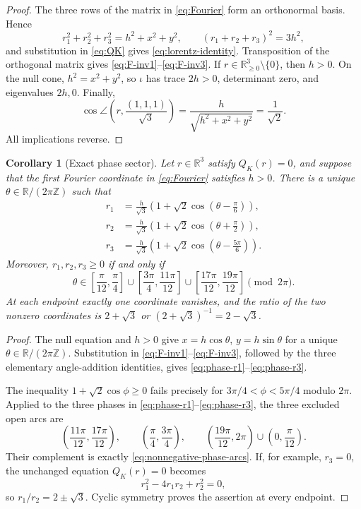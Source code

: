 \documentclass[11pt]{article}
\numberwithin{equation}{section}
\newtheorem{corollary}[theorem]{Corollary}
\theoremstyle{definition}
\theoremstyle{remark}
\newcommand{\R}{\mathbb R}
\newcommand{\Z}{\mathbb Z}
\begin{document}
\begin{proof}
The three rows of the matrix in \eqref{eq:Fourier} form an orthonormal basis.  Hence
\[
 r_1^2+r_2^2+r_3^2=h^2+x^2+y^2,
 \qquad (r_1+r_2+r_3)^2=3h^2,
\]
and substitution in \eqref{eq:QK} gives \eqref{eq:lorentz-identity}.  Transposition of the orthogonal matrix gives \eqref{eq:F-inv1}--\eqref{eq:F-inv3}.  If $r\in\R_{\geq0}^3\setminus\{0\}$, then $h>0$.  On the null cone, $h^2=x^2+y^2$, so $\iota$ has trace $2h>0$, determinant zero, and eigenvalues $2h,0$.  Finally,
\[
 \cos\angle\left(r,\frac{(1,1,1)}{\sqrt3}\right)
 =\frac{h}{\sqrt{h^2+x^2+y^2}}=\frac1{\sqrt2}.
\]
All implications reverse.
\end{proof}

\begin{corollary}[Exact phase sector]
\label{cor:exact-phase-sector}
Let $r\in\R^3$ satisfy $Q_K(r)=0$, and suppose that the first Fourier
coordinate in \eqref{eq:Fourier} satisfies $h>0$.  There is a unique
$\theta\in\R/(2\pi\Z)$ such that
\begin{align}
 r_1&=\frac h{\sqrt3}
 \left(1+\sqrt2\cos\left(\theta-\frac\pi6\right)\right),
 \label{eq:phase-r1}\\
 r_2&=\frac h{\sqrt3}
 \left(1+\sqrt2\cos\left(\theta+\frac\pi2\right)\right),
 \label{eq:phase-r2}\\
 r_3&=\frac h{\sqrt3}
 \left(1+\sqrt2\cos\left(\theta-\frac{5\pi}6\right)\right).
 \label{eq:phase-r3}
\end{align}
Moreover, $r_1,r_2,r_3\geq0$ if and only if
\begin{equation}
 \theta\in
 \left[\frac\pi{12},\frac\pi4\right]
 \cup\left[\frac{3\pi}4,\frac{11\pi}{12}\right]
 \cup\left[\frac{17\pi}{12},\frac{19\pi}{12}\right]
 \pmod {2\pi}.
 \label{eq:nonnegative-phase-arcs}
\end{equation}
At each endpoint exactly one coordinate vanishes, and the ratio of the two
nonzero coordinates is $2+\sqrt3$ or $(2+\sqrt3)^{-1}=2-\sqrt3$.
\end{corollary}

\begin{proof}
The null equation and $h>0$ give
$x=h\cos\theta$, $y=h\sin\theta$ for a unique
$\theta\in\R/(2\pi\Z)$.  Substitution in
\eqref{eq:F-inv1}--\eqref{eq:F-inv3}, followed by the three elementary
angle-addition identities, gives
\eqref{eq:phase-r1}--\eqref{eq:phase-r3}.

The inequality $1+\sqrt2\cos\phi\geq0$ fails precisely for
$3\pi/4<\phi<5\pi/4$ modulo $2\pi$.  Applied to the three phases in
\eqref{eq:phase-r1}--\eqref{eq:phase-r3}, the three excluded open arcs are
\[
 \left(\frac{11\pi}{12},\frac{17\pi}{12}\right),\qquad
 \left(\frac\pi4,\frac{3\pi}4\right),\qquad
 \left(\frac{19\pi}{12},2\pi\right)
 \cup\left(0,\frac\pi{12}\right).
\]
Their complement is exactly \eqref{eq:nonnegative-phase-arcs}.  If, for
example, $r_3=0$, the unchanged equation $Q_K(r)=0$ becomes
\[
 r_1^2-4r_1r_2+r_2^2=0,
\]
so $r_1/r_2=2\pm\sqrt3$.  Cyclic symmetry proves the assertion at every
endpoint.
\end{proof}
\end{document}
